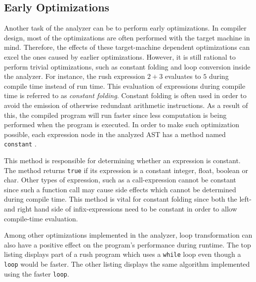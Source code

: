 \subsection{Early Optimizations}

Another task of the analyzer can be to perform early optimizations.
In compiler design, most of the optimizations are often performed with the target machine in mind.
Therefore, the effects of these target-machine dependent optimizations can excel the ones caused by earlier optimizations.
However, it is still rational to perform trivial optimizations, such as constant folding and loop conversion inside the analyzer.
For instance, the rush expression $2 + 3$ evaluates to $5$ during compile time instead of run time.
This evaluation of expressions during compile time is referred to as \emph{constant folding}.
Constant folding is often used in order to avoid the emission of otherwise redundant arithmetic instructions.
As a result of this, the compiled program will run faster since less computation is being performed when the program is executed.
In order to make such optimization possible, each expression node in the analyzed AST has a method named \texttt{constant} \cite[p.~54]{wirth_compiler_construction_2005}.


This method is responsible for determining whether an expression is constant.
The method returns \texttt{true} if its expression is a constant integer, float, boolean or char.
Other types of expression, such as a call-expression cannot be constant since such a function call may cause side effects which cannot be determined during compile time.
This method is vital for constant folding since both the left- and right hand side of infix-expressions need to be constant in order to allow compile-time evaluation.

Among other optimizations implemented in the analyzer, loop transformation can also have a positive effect on the program's performance during runtime.
The top listing displays part of a rush program which uses a \texttt{while} loop even though a \texttt{loop} would be faster.
The other listing displays the same algorithm implemented using the faster \texttt{loop}.



